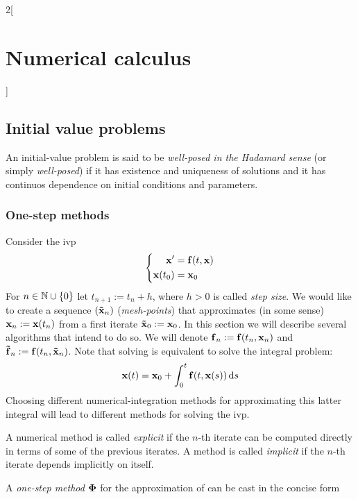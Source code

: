 \documentclass[../../../main_math.tex]{subfiles}
\begin{document}
\begin{multicols}{2}[\section{Numerical calculus}]
  \subsection{Initial value problems}
  \begin{definition}
    An initial-value problem is said to be \emph{well-posed in the Hadamard sense} (or simply \emph{well-posed}) if it has existence and uniqueness of solutions and it has continuos dependence on initial conditions and parameters.
  \end{definition}
  \subsubsection{One-step methods}
  Consider the ivp
  \begin{equation}\label{NC:ivp}
    \left\{
    \begin{aligned}
      \boldsymbol{\mathrm{x}}'     & = \boldsymbol{\mathrm{f}}(t,\boldsymbol{\mathrm{x}}) \\
      \boldsymbol{\mathrm{x}}(t_0) & = \boldsymbol{\mathrm{x}}_0
    \end{aligned}
    \right.
  \end{equation}
  For $n\in\mathbb{N}\cup\{0\}$ let $t_{n+1}:=t_{n}+h$, where $h>0$ is called \emph{step size}. We would like to create a sequence $(\boldsymbol{\mathrm{\tilde{x}}}_n)$ (\emph{mesh-points}) that approximates (in some sense) $\boldsymbol{\mathrm{{x}}}_n:=\boldsymbol{\mathrm{{x}}}(t_n)$ from a first iterate $\boldsymbol{\mathrm{\tilde{x}}}_0:=\boldsymbol{\mathrm{x}}_0$. In this section we will describe several algorithms that intend to do so. We will denote $\boldsymbol{\mathrm{f}}_n:=\boldsymbol{\mathrm{f}}(t_n,\boldsymbol{\mathrm{x}}_{n})$ and $\boldsymbol{\mathrm{\tilde{f}}}_n:=\boldsymbol{\mathrm{f}}(t_n,\boldsymbol{\mathrm{\tilde{x}}}_{n})$. Note that solving  is equivalent to solve the integral problem:
  $$\boldsymbol{\mathrm{x}}(t)=\boldsymbol{\mathrm{x}}_0+\int_0^t\boldsymbol{\mathrm{f}}(t,\boldsymbol{\mathrm{x}}(s))\dd{s}$$
  Choosing different numerical-integration methods for approximating this latter integral will lead to different methods for solving the ivp.
  \begin{definition}
    A numerical method is called \emph{explicit} if the $n$-th iterate can be computed directly in terms of some of the previous iterates. A method is called \emph{implicit} if the $n$-th iterate depends implicitly on itself.
  \end{definition}
  \begin{definition}
    A \emph{one-step method} $\boldsymbol{\mathrm{\Phi}}$ for the approximation of  can be cast in the concise form

\end{definition}
\end{multicols}
\end{document}
